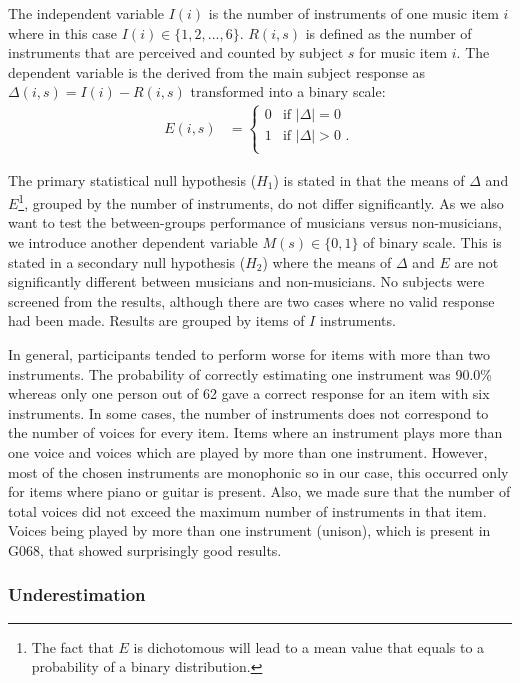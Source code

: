 The independent variable $I(i)$ is the number of instruments of one music item $i$ where in this case $I(i) \in \{1,2,...,6\}$. $R(i,s)$ is defined as the number of instruments that are perceived and counted by subject $s$ for music item $i$. The dependent variable is the derived from the main subject response as $\Delta(i,s) = I(i) - R(i,s)$ transformed into a binary scale:
\begin{align}%
\label{eq:response}
    E(i,s)&=\begin{cases}
        0 & \text{if $|\Delta| = 0 $ } \\
        1 & \text{if $|\Delta| > 0 $ .}\\
    \end{cases}
\end{align}
\par
The primary statistical null hypothesis ($H_1$) is stated in that the means of $\Delta$ and $E$\footnote{The fact that $E$ is dichotomous will lead to a mean value that equals to a probability of a binary distribution.}, grouped by the number of instruments, do not differ significantly. As we also want to test the between-groups performance of musicians versus non-musicians, we introduce another dependent variable $M(s) \in \{0,1\}$ of binary scale. This is stated in a secondary null hypothesis ($H_2$) where the means of $\Delta$ and $E$ are not significantly different between musicians and non-musicians.
No subjects were screened from the results, although there are two cases where no valid response had been made. Results are grouped by items of $I$ instruments.
\par
In general, participants tended to perform worse for items with more than two instruments. The probability of correctly estimating one instrument was 90.0\% whereas only one person out of 62 gave a correct response for an item with six instruments. In some cases, the number of instruments does not correspond to the number of voices for every item. Items where an instrument plays more than one voice and voices which are played by more than one instrument. However, most of the chosen instruments are monophonic so in our case, this occurred only for items where piano or guitar is present. Also, we made sure that the number of total voices did not exceed the maximum number of instruments in that item. Voices being played by more than one instrument (unison), which is present in G068, that showed surprisingly good results.

\subsubsection*{Underestimation}

